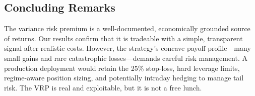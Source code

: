 \documentclass[11pt,a4paper]{article}
\begin{document}
\subsection{Concluding Remarks}

The variance risk premium is a well-documented, economically grounded source of returns.
Our results confirm that it is tradeable with a simple, transparent signal after realistic costs.
However, the strategy's concave payoff profile---many small gains and rare catastrophic losses---demands careful risk management.
A production deployment would retain the 25\% stop-loss, hard leverage limits, regime-aware position sizing, and potentially intraday hedging to manage tail risk.
The VRP is real and exploitable, but it is not a free lunch.


\newpage

\end{document}
